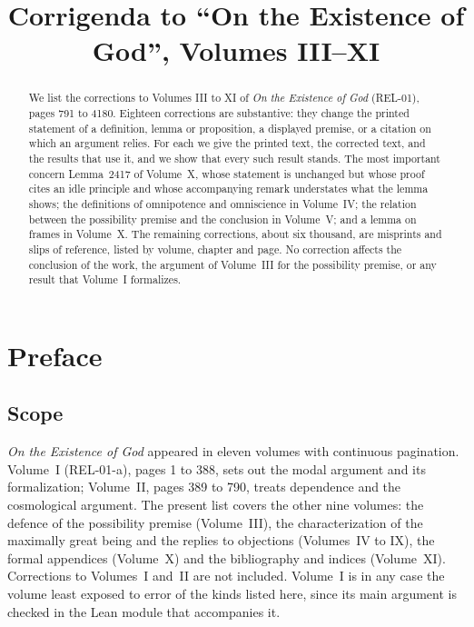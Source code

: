 \documentclass{situationist-preprint}
\title{Corrigenda to \enquote{On the Existence of God}, Volumes III--XI}
\begin{document}
\maketitle

\begin{abstract}
We list the corrections to Volumes III to XI of \emph{On the Existence of God} (REL-01), pages 791 to 4180. Eighteen corrections are substantive: they change the printed statement of a definition, lemma or proposition, a displayed premise, or a citation on which an argument relies. For each we give the printed text, the corrected text, and the results that use it, and we show that every such result stands. The most important concern Lemma~2417 of Volume~X, whose statement is unchanged but whose proof cites an idle principle and whose accompanying remark understates what the lemma shows; the definitions of omnipotence and omniscience in Volume~IV; the relation between the possibility premise and the conclusion in Volume~V; and a lemma on frames in Volume~X. The remaining corrections, about six thousand, are misprints and slips of reference, listed by volume, chapter and page. No correction affects the conclusion of the work, the argument of Volume~III for the possibility premise, or any result that Volume~I formalizes.
\end{abstract}

\section{Preface}

\subsection{Scope}

\emph{On the Existence of God} appeared in eleven volumes with continuous pagination. Volume~I (REL-01-a), pages 1 to 388, sets out the modal argument and its formalization; Volume~II, pages 389 to 790, treats dependence and the cosmological argument. The present list covers the other nine volumes: the defence of the possibility premise (Volume~III), the characterization of the maximally great being and the replies to objections (Volumes~IV to IX), the formal appendices (Volume~X) and the bibliography and indices (Volume~XI). Corrections to Volumes~I and~II are not included. Volume~I is in any case the volume least exposed to error of the kinds listed here, since its main argument is checked in the Lean module that accompanies it.
\end{document}
